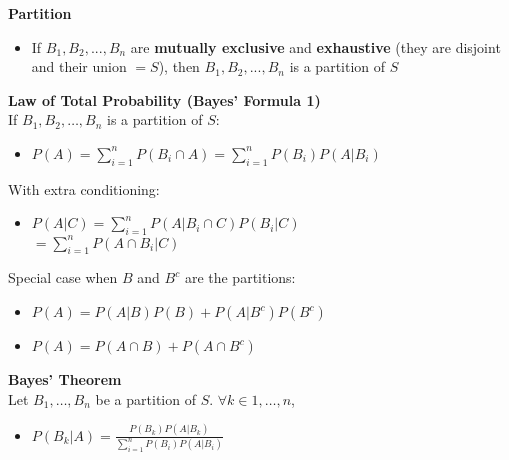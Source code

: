 \documentclass[a4paper, 12pt]{article}
\begin{document}
\begin{multicols*}{4}
\begin{minipage}{.5\linewidth}
\end{minipage}
\textbf{Partition}
\begin{itemize}
    \item If $B_1, B_2, ..., B_n$ are \textbf{mutually exclusive} and \textbf{exhaustive} (they are disjoint and their union $= S$), then $B_1, B_2, ..., B_n$ is a partition of $S$
\end{itemize}
\textbf{Law of Total Probability (Bayes' Formula 1)} \\
If $B_1, B_2, \dots, B_n$ is a partition of $S$:
\begin{itemize}
    \item $P(A) = \sum_{i=1}^n P(B_i \cap A) = \sum_{i=1}^n P(B_i)P(A|B_i)$
\end{itemize}
With extra conditioning:
\begin{itemize}
    \item $P(A|C) = \sum_{i=1}^n P(A|B_i \cap C)P(B_i|C)$\\ $= \sum_{i=1}^n P(A \cap B_i|C)$
\end{itemize}
Special case when $B$ and $B^c$ are the partitions:
\begin{itemize}
    \item $P(A) = P(A|B)P(B) + P(A|B^c)P(B^c)$
    \item $P(A) = P(A \cap B) + P(A \cap B^c)$
\end{itemize}
\textbf{Bayes' Theorem} \\
Let $B_1, \ldots , B_n$ be a partition of $S$. $\forall k \in 1, \ldots , n$,
\begin{itemize}
    \item $P(B_k|A) = \frac{P(B_k)P(A|B_k)}{\sum_{i=1}^n P(B_i)P(A|B_i)}$
\end{itemize}

\medskip


\end{multicols*}
\end{document}

